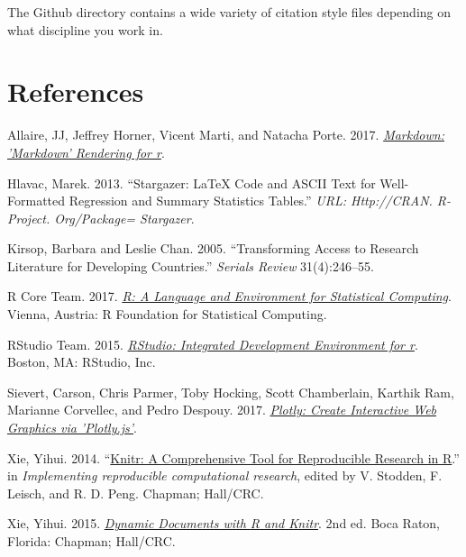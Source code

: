 \documentclass[
  12pt,
]{article}
\newlength{\cslhangindent}
\newlength{\cslentryspacingunit} %
\newenvironment{CSLReferences}[2] %
 {%
  \setlength{\parindent}{0pt}
  \ifodd #1
  \let\oldpar\par
  \def\par{\hangindent=\cslhangindent\oldpar}
  \fi
  \setlength{\parskip}{#2\cslentryspacingunit}
 }%
 {}
\begin{document}
The Github directory contains a wide variety of citation style files
depending on what discipline you work in.

\hypertarget{references}{%
\section{References}\label{references}}

\linespread{1}

\hypertarget{refs}{}
\begin{CSLReferences}{1}{0}
\leavevmode{}%
Allaire, JJ, Jeffrey Horner, Vicent Marti, and Natacha Porte. 2017.
\emph{\href{https://CRAN.R-project.org/package=markdown}{Markdown:
'Markdown' Rendering for r}}.

\leavevmode{}%
Hlavac, Marek. 2013. {``Stargazer: LaTeX Code and ASCII Text for
Well-Formatted Regression and Summary Statistics Tables.''} \emph{URL:
Http://CRAN. R-Project. Org/Package= Stargazer}.

\leavevmode{}%
Kirsop, Barbara and Leslie Chan. 2005. {``Transforming Access to
Research Literature for Developing Countries.''} \emph{Serials Review}
31(4):246--55.

\leavevmode{}%
R Core Team. 2017. \emph{\href{https://www.R-project.org/}{R: A Language
and Environment for Statistical Computing}}. Vienna, Austria: R
Foundation for Statistical Computing.

\leavevmode{}%
RStudio Team. 2015. \emph{\href{http://www.rstudio.com/}{RStudio:
Integrated Development Environment for r}}. Boston, MA: RStudio, Inc.

\leavevmode{}%
Sievert, Carson, Chris Parmer, Toby Hocking, Scott Chamberlain, Karthik
Ram, Marianne Corvellec, and Pedro Despouy. 2017.
\emph{\href{https://CRAN.R-project.org/package=plotly}{Plotly: Create
Interactive Web Graphics via 'Plotly.js'}}.

\leavevmode{}%
Xie, Yihui. 2014.
{``\href{http://www.crcpress.com/product/isbn/9781466561595}{Knitr: A
Comprehensive Tool for Reproducible Research in {R}}.''} in
\emph{Implementing reproducible computational research}, edited by V.
Stodden, F. Leisch, and R. D. Peng. Chapman; Hall/CRC.

\leavevmode{}%
Xie, Yihui. 2015. \emph{\href{https://yihui.name/knitr/}{Dynamic
Documents with {R} and Knitr}}. 2nd ed. Boca Raton, Florida: Chapman;
Hall/CRC.


\end{CSLReferences}
\end{document}
